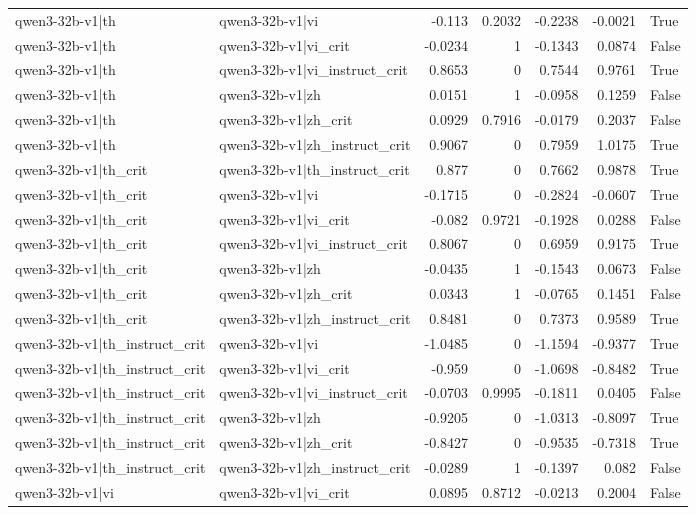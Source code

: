 \begin{table}
\begin{tabular}{l l r r r r l}
qwen3-32b-v1|th & qwen3-32b-v1|vi & -0.113 & 0.2032 & -0.2238 & -0.0021 & True \\
qwen3-32b-v1|th & qwen3-32b-v1|vi_crit & -0.0234 & 1 & -0.1343 & 0.0874 & False \\
qwen3-32b-v1|th & qwen3-32b-v1|vi_instruct_crit & 0.8653 & 0 & 0.7544 & 0.9761 & True \\
qwen3-32b-v1|th & qwen3-32b-v1|zh & 0.0151 & 1 & -0.0958 & 0.1259 & False \\
qwen3-32b-v1|th & qwen3-32b-v1|zh_crit & 0.0929 & 0.7916 & -0.0179 & 0.2037 & False \\
qwen3-32b-v1|th & qwen3-32b-v1|zh_instruct_crit & 0.9067 & 0 & 0.7959 & 1.0175 & True \\
qwen3-32b-v1|th_crit & qwen3-32b-v1|th_instruct_crit & 0.877 & 0 & 0.7662 & 0.9878 & True \\
qwen3-32b-v1|th_crit & qwen3-32b-v1|vi & -0.1715 & 0 & -0.2824 & -0.0607 & True \\
qwen3-32b-v1|th_crit & qwen3-32b-v1|vi_crit & -0.082 & 0.9721 & -0.1928 & 0.0288 & False \\
qwen3-32b-v1|th_crit & qwen3-32b-v1|vi_instruct_crit & 0.8067 & 0 & 0.6959 & 0.9175 & True \\
qwen3-32b-v1|th_crit & qwen3-32b-v1|zh & -0.0435 & 1 & -0.1543 & 0.0673 & False \\
qwen3-32b-v1|th_crit & qwen3-32b-v1|zh_crit & 0.0343 & 1 & -0.0765 & 0.1451 & False \\
qwen3-32b-v1|th_crit & qwen3-32b-v1|zh_instruct_crit & 0.8481 & 0 & 0.7373 & 0.9589 & True \\
qwen3-32b-v1|th_instruct_crit & qwen3-32b-v1|vi & -1.0485 & 0 & -1.1594 & -0.9377 & True \\
qwen3-32b-v1|th_instruct_crit & qwen3-32b-v1|vi_crit & -0.959 & 0 & -1.0698 & -0.8482 & True \\
qwen3-32b-v1|th_instruct_crit & qwen3-32b-v1|vi_instruct_crit & -0.0703 & 0.9995 & -0.1811 & 0.0405 & False \\
qwen3-32b-v1|th_instruct_crit & qwen3-32b-v1|zh & -0.9205 & 0 & -1.0313 & -0.8097 & True \\
qwen3-32b-v1|th_instruct_crit & qwen3-32b-v1|zh_crit & -0.8427 & 0 & -0.9535 & -0.7318 & True \\
qwen3-32b-v1|th_instruct_crit & qwen3-32b-v1|zh_instruct_crit & -0.0289 & 1 & -0.1397 & 0.082 & False \\
qwen3-32b-v1|vi & qwen3-32b-v1|vi_crit & 0.0895 & 0.8712 & -0.0213 & 0.2004 & False \\

\end{tabular}
\end{table}
